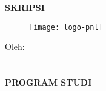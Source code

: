 \begin{center}

\large
\MakeUppercase{\textbf{skripsi}}

\vfill
\begin{figure}[h]
\centering
\texttt{[image: logo-pnl]}
\end{figure}

\vfill
\normalsize
\MakeUppercase{\textbf{\judulId}}

\vfill
Oleh: \\
\MakeUppercase{\mahasiswa} \\
\nim \\

\vfill
\MakeUppercase{
\textbf{
program studi \prodi \\
\jurusan \\
\institusi \\
\the\year{}
}}

\end{center}
